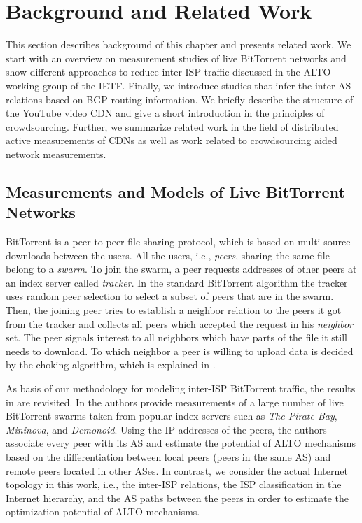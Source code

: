 \section{Background and Related Work}\label{sec:p2p:background}

This section describes background of this chapter and presents related work. We start with an overview on measurement studies of live BitTorrent networks and show different approaches to reduce inter-ISP traffic discussed in the ALTO working group of the IETF. Finally, we introduce studies that infer the inter-AS relations based on BGP routing information.
We briefly describe the structure of the YouTube video CDN and give a short introduction in the principles of crowdsourcing.
Further, we summarize related work in the field of distributed active measurements of CDNs as well as work related to crowdsourcing aided network measurements.

\subsection{Measurements and Models of Live BitTorrent Networks}

BitTorrent is a peer-to-peer file-sharing protocol, which is based on multi-source downloads between the users. All the users, i.e., \textit{peers}, sharing the same file belong to a \textit{swarm}. To join the swarm, a peer requests addresses of other peers at an index server called \textit{tracker}. In the standard BitTorrent algorithm the tracker uses random peer selection to select a subset of peers that are in the swarm. Then, the joining peer tries to establish a neighbor relation to the peers it got from the tracker and collects all peers which accepted the request in his \textit{neighbor} set. The peer signals interest to all neighbors which have parts of the file it still needs to download. To which neighbor a peer is willing to upload data is decided by the choking algorithm, which is explained in \cite{cohen:bt}.

As basis of our methodology for modeling inter-ISP BitTorrent traffic, the results in \cite{Hossfeld2011} are revisited. In \cite{Hossfeld2011} the authors provide measurements of a large number of live BitTorrent swarms taken from popular index servers such as \emph{The Pirate Bay}, \emph{Mininova}, and \emph{Demonoid}. Using the IP addresses of the peers, the authors associate every peer with its AS and estimate the potential of ALTO mechanisms based on the differentiation between local peers (peers in the same AS) and remote peers located in other ASes. In contrast, we consider the actual Internet topology in this work, i.e., the inter-ISP relations, the ISP classification in the Internet hierarchy, and the AS paths between the peers in order to estimate the optimization potential of ALTO mechanisms.

